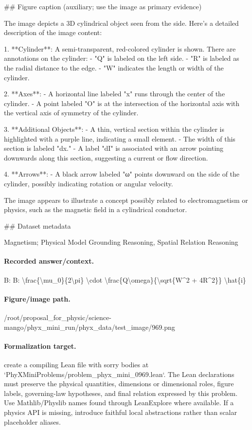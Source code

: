 \#\# Figure caption (auxiliary; use the image as primary evidence)

The image depicts a 3D cylindrical object seen from the side. Here's a detailed description of the image content:

1. **Cylinder**: A semi-transparent, red-colored cylinder is shown. There are annotations on the cylinder:
   - "Q" is labeled on the left side.
   - "R" is labeled as the radial distance to the edge.
   - "W" indicates the length or width of the cylinder.

2. **Axes**:
   - A horizontal line labeled "x" runs through the center of the cylinder.
   - A point labeled "O" is at the intersection of the horizontal axis with the vertical axis of symmetry of the cylinder.

3. **Additional Objects**:
   - A thin, vertical section within the cylinder is highlighted with a purple line, indicating a small element.
   - The width of this section is labeled "dx."
   - A label "dI" is associated with an arrow pointing downwards along this section, suggesting a current or flow direction.

4. **Arrows**:
   - A black arrow labeled "ω" points downward on the side of the cylinder, possibly indicating rotation or angular velocity.

The image appears to illustrate a concept possibly related to electromagnetism or physics, such as the magnetic field in a cylindrical conductor.

\#\# Dataset metadata

Magnetism; Physical Model Grounding Reasoning, Spatial Relation Reasoning

\paragraph{Recorded answer/context.}
B: B: \textbackslash{}frac\{\textbackslash{}mu\_0\}\{2\textbackslash{}pi\} \textbackslash{}cdot \textbackslash{}frac\{Q\textbackslash{}omega\}\{\textbackslash{}sqrt\{W\textasciicircum{}2 + 4R\textasciicircum{}2\}\} \textbackslash{}hat\{i\}

\paragraph{Figure/image path.}
/root/proposal\_for\_physic/science-mango/phyx\_mini\_run/phyx\_data/test\_image/969.png

\paragraph{Formalization target.}
create a compiling Lean file with sorry bodies at `PhyXMiniProblems/problem\_phyx\_mini\_0969.lean`. The Lean declarations must preserve the physical quantities, dimensions or dimensional roles, figure labels, governing-law hypotheses, and final relation expressed by this problem.
Use Mathlib/Physlib names found through LeanExplore where available. If a physics API is missing, introduce faithful local abstractions rather than scalar placeholder aliases.

